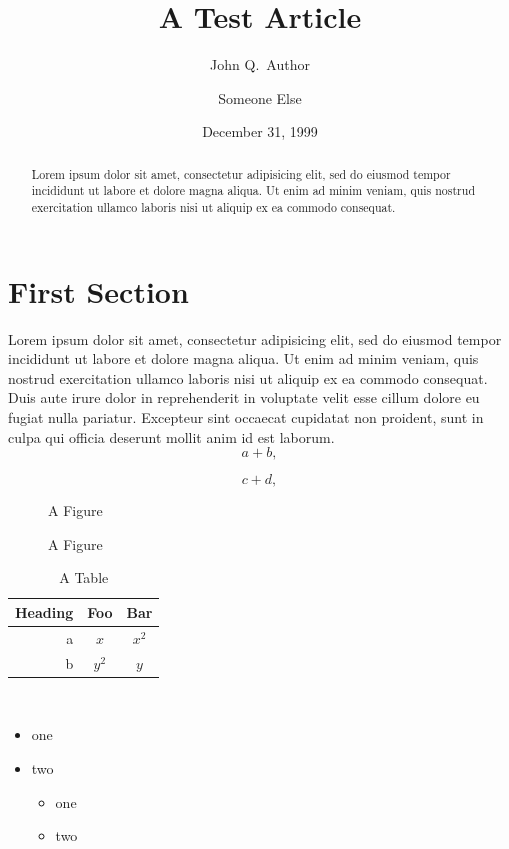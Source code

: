 \documentclass{article}
\title{A Test Article}
\author{John Q.~Author \and Someone Else}
\date{December 31, 1999}
\begin{document}
\maketitle

\begin{abstract}
Lorem ipsum dolor sit amet, consectetur adipisicing elit, sed do eiusmod tempor incididunt ut labore et dolore magna aliqua. Ut enim ad minim veniam, quis nostrud exercitation ullamco laboris nisi ut aliquip ex ea commodo consequat.
\end{abstract}

\section{First Section}
Lorem ipsum dolor sit amet, consectetur adipisicing elit, sed do eiusmod tempor incididunt ut labore et dolore magna aliqua. Ut enim ad minim veniam, quis nostrud exercitation ullamco laboris nisi ut aliquip ex ea commodo consequat. Duis aute irure dolor in reprehenderit in voluptate velit esse cillum dolore eu fugiat nulla pariatur. Excepteur sint occaecat cupidatat non proident, sunt in culpa qui officia deserunt mollit anim id est laborum.
\begin{equation}
 a + b,
\end{equation}

\begin{equation}
 c + d,
\end{equation}

\begin{figure}
\begin{centering}
A Figure\\
\end{centering}
\caption{A Figure}
\end{figure}

\begin{table}
\begin{centering}
\caption{A Table}
\begin{tabular}{r|cc}
Heading & Foo & Bar\\\hline
a & $x$ & $x^2$\\
b & $y^2$ & $y$\\
\end{tabular}\\
\end{centering}
\end{table}

\begin{itemize}
 \item one
 \item two
   \begin{itemize}
    \item one
    \item two
   \end{itemize}
\end{itemize}
\end{document}
